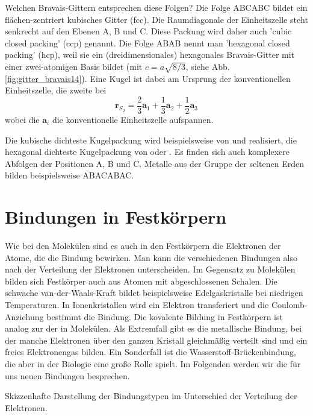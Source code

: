 Welchen Bravais-Gittern entsprechen diese Folgen?  Die Folge ABCABC bildet ein flächen-zentriert kubisches Gitter (fcc).  Die Raumdiagonale der  Einheitszelle steht senkrecht auf den Ebenen A, B und C. Diese Packung wird daher auch 'cubic closed packing' (ccp) genannt. Die Folge ABAB nennt man  'hexagonal closed packing' (hcp), weil sie ein (dreidimensionales) hexagonales Bravais-Gitter mit einer zwei-atomigen Basis bildet (mit $c=a \sqrt{8/3}$, siehe Abb. \ref{fig:gitter_bravais14}). Eine Kugel ist dabei am Ursprung der konventionellen Einheitszelle, die zweite bei 
\begin{equation}
 \mathbf{r}_{S_2} =  \frac{2}{3}  \mathbf{a}_1 + \frac{1}{3}  \mathbf{a}_2 + \frac{1}{2}  \mathbf{a}_3  
\end{equation}
 wobei die $\mathbf{a}_i$ die konventionelle Einheitszelle aufspannen.

Die kubische dichteste Kugelpackung wird beispielsweise von  und  realisiert, die hexagonal dichteste Kugelpackung von  oder . Es finden sich auch komplexere Abfolgen der Positionen A, B und C. Metalle aus der Gruppe der seltenen Erden bilden beispielsweise ABACABAC.






\section{Bindungen in Festkörpern}



Wie bei den Molekülen  sind es auch in den Festkörpern die Elektronen der Atome, die die Bindung bewirken. Man kann die verschiedenen Bindungen also nach der Verteilung der Elektronen unterscheiden. Im Gegensatz zu Molekülen bilden sich Festkörper auch aus Atomen mit abgeschlossenen Schalen. Die schwache van-der-Waals-Kraft bildet beispielsweise Edelgaskristalle bei niedrigen Temperaturen. In Ionenkristallen wird ein Elektron transferiert und die Coulomb-Anziehung  bestimmt die Bindung. Die kovalente Bildung in Festkörpern ist analog zur der in Molekülen. Als Extremfall gibt es die metallische Bindung, bei der manche Elektronen über den ganzen Kristall gleichmäßig verteilt sind und  ein freies Elektronengas bilden. Ein Sonderfall ist die Wasserstoff-Brückenbindung, die aber in der Biologie eine große Rolle spielt. Im Folgenden werden wir die für uns neuen  Bindungen besprechen.

\begin{marginfigure}

\caption{Skizzenhafte Darstellung der Bindungstypen im Unterschied der Verteilung der Elektronen.}
\end{marginfigure}



